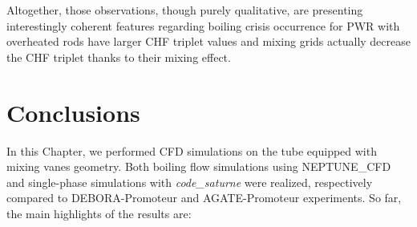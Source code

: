 \npar

Altogether, those observations, though purely qualitative, are presenting interestingly coherent features regarding boiling crisis occurrence for PWR with overheated rods have larger CHF triplet values and mixing grids actually decrease the CHF triplet thanks to their mixing effect.

\clearpage


\section{Conclusions}

In this Chapter, we performed CFD simulations on the tube equipped with mixing vanes geometry. Both boiling flow simulations using NEPTUNE\_CFD and single-phase simulations with \textit{code\_saturne} were realized, respectively compared to DEBORA-Promoteur and AGATE-Promoteur experiments. So far, the main highlights of the results are:

